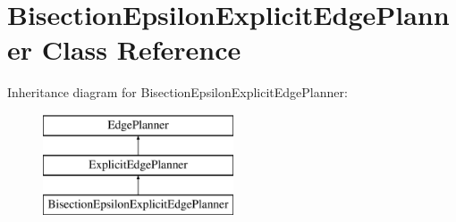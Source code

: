\section{Bisection\+Epsilon\+Explicit\+Edge\+Planner Class Reference}
\label{classBisectionEpsilonExplicitEdgePlanner}
Inheritance diagram for Bisection\+Epsilon\+Explicit\+Edge\+Planner\+:\begin{figure}[H]
\begin{center}
\leavevmode
\includegraphics[height=3.000000cm]{classBisectionEpsilonExplicitEdgePlanner}
\end{center}
\end{figure}
